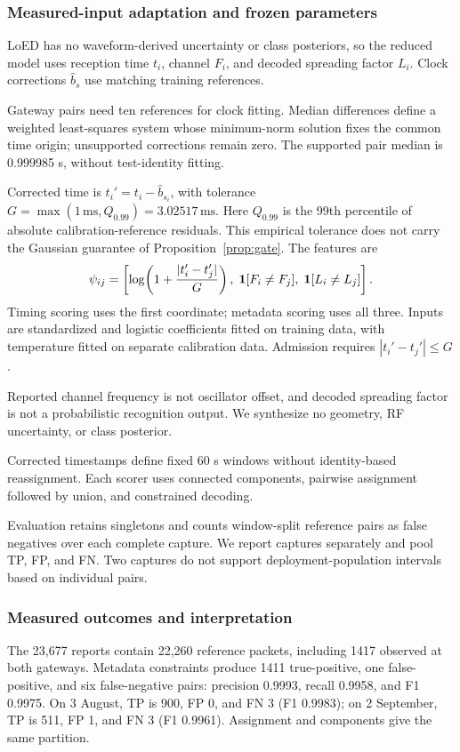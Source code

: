 \subsubsection{Measured-input adaptation and frozen parameters}
LoED has no waveform-derived uncertainty or class posteriors, so the reduced model uses reception time $t_i$, channel $F_i$, and decoded spreading factor $L_i$. Clock corrections $\widehat b_s$ use matching training references.

Gateway pairs need ten references for clock fitting. Median differences define a weighted least-squares system whose minimum-norm solution fixes the common time origin; unsupported corrections remain zero. The supported pair median is 0.999985 s, without test-identity fitting.

Corrected time is $t_i'=t_i-\widehat b_{s_i}$, with tolerance $G=\max(1\,\mathrm{ms},Q_{0.99})=3.02517\,\mathrm{ms}$. Here $Q_{0.99}$ is the 99th percentile of absolute calibration-reference residuals. This empirical tolerance does not carry the Gaussian guarantee of Proposition~\ref{prop:gate}. The features are
\begin{equation}
 \psi_{ij}=\left[\log\!\left(1+\frac{|t_i'-t_j'|}{G}\right),\;
 \mathbf{1}[F_i\ne F_j],\;\mathbf{1}[L_i\ne L_j]\right].\label{eq:loed_features}
\end{equation}
Timing scoring uses the first coordinate; metadata scoring uses all three. Inputs are standardized and logistic coefficients fitted on training data, with temperature fitted on separate calibration data. Admission requires $|t_i'-t_j'|\leq G$.

Reported channel frequency is not oscillator offset, and decoded spreading factor is not a probabilistic recognition output. We synthesize no geometry, RF uncertainty, or class posterior.

Corrected timestamps define fixed 60 s windows without identity-based reassignment. Each scorer uses connected components, pairwise assignment followed by union, and constrained decoding.

Evaluation retains singletons and counts window-split reference pairs as false negatives over each complete capture. We report captures separately and pool TP, FP, and FN. Two captures do not support deployment-population intervals based on individual pairs.

\subsubsection{Measured outcomes and interpretation}
The 23,677 reports contain 22,260 reference packets, including 1417 observed at both gateways. Metadata constraints produce 1411 true-positive, one false-positive, and six false-negative pairs: precision 0.9993, recall 0.9958, and F1 0.9975. On 3 August, TP is 900, FP 0, and FN 3 (F1 0.9983); on 2 September, TP is 511, FP 1, and FN 3 (F1 0.9961). Assignment and components give the same partition.

